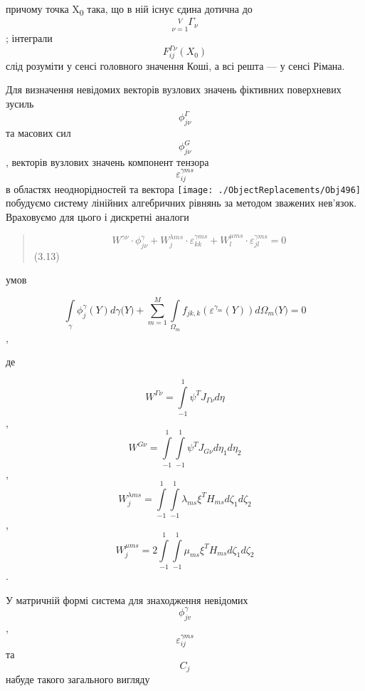 причому точка X\textsubscript{0} така, що в ній існує єдина дотична до
\[{\underset{\nu = 1}{\overset{V}{}}\Gamma_{\nu}}{}\]; інтеграли
\[{F_{\mathit{\text{ij}}}^{\mathit{\Gamma\nu}}(X_{0})}{}\] слід розуміти
у сенсі головного значення Коші, а всі решта --- у сенсі Рімана.

Для визначення невідомих векторів вузлових значень фіктивних поверхневих
зусиль \[\phi_{\mathit{j\nu}}^{\Gamma}{}\] та масових сил
\[\phi_{\mathit{j\nu}}^{G}{}\], векторів вузлових значень компонент
тензора
\[\varepsilon_{\mathit{\text{ij}}}^{\gamma\mathit{\text{ms}}}{}\] в
областях неоднорідностей та вектора
\texttt{[image: ./ObjectReplacements/Obj496]}
побудуємо систему лінійних алгебричних рівнянь за методом зважених
нев'язок. Враховуємо для цього і дискретні аналоги

\begin{quote}
\[{{{W^{\mathit{\text{γν}}} \cdot \phi_{\mathit{j\nu}}^{\gamma}} + {W_{j}^{\lambda\mathit{\text{ms}}} \cdot \varepsilon_{\mathit{\text{kk}}}^{\gamma\mathit{\text{ms}}}} + {W_{l}^{\mu\mathit{\text{ms}}} \cdot \varepsilon_{\mathit{\text{jl}}}^{\gamma\mathit{\text{ms}}}}} = 0}{}\]
(3.13)
\end{quote}

умов

\[{\int\limits_{\gamma}{\phi_{j}^{\gamma}(Y)\mathit{d\gamma}(Y{) + {\sum\limits_{m = 1}^{M}{\int\limits_{\Omega_{m}}{f_{\mathit{\text{jk}},k}(\varepsilon^{\gamma_{m}}(Y))d\Omega_{m}{(Y{) = 0}}}}}}}}{}\],

де

\[{W^{\mathit{\Gamma\nu}} = {\int\limits_{- 1}^{1}{\psi^{T}J_{\mathit{\Gamma\nu}}\mathit{d\eta}}}}{}\],
\[{W^{\mathit{G\nu}} = {\int\limits_{- 1}^{1}{\int\limits_{- 1}^{1}{\psi^{T}J_{\mathit{G\nu}}\mathit{d\eta}_{1}\mathit{d\eta}_{2}}}}}{}\],
\[{W_{j}^{\lambda\mathit{\text{ms}}} = {\int\limits_{- 1}^{1}{\int\limits_{- 1}^{1}{\lambda_{\mathit{\text{ms}}}\xi^{T}H_{\mathit{\text{ms}}}\mathit{d\zeta}_{1}\mathit{d\zeta}_{2}}}}}{}\],
\[{{W_{j}^{\mu\mathit{\text{ms}}} = 2}{\int\limits_{- 1}^{1}{\int\limits_{- 1}^{1}{\mu_{\mathit{\text{ms}}}\xi^{T}H_{\mathit{\text{ms}}}\mathit{d\zeta}_{1}\mathit{d\zeta}_{2}}}}}{}\].

У матричній формі система для знаходження невідомих
\[\phi_{\mathit{\text{jv}}}^{\gamma}{}\],
\[\varepsilon_{\mathit{\text{ij}}}^{\gamma\mathit{\text{ms}}}{}\] та
\[C_{j}{}\] набуде такого загального вигляду


